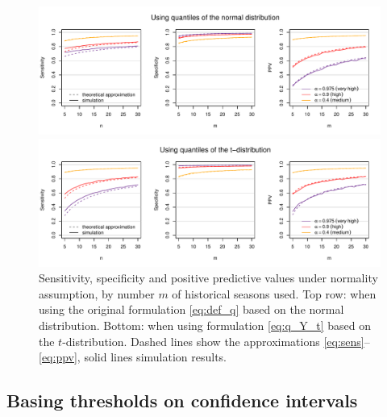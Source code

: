 \documentclass[12pt]{article}
\begin{document}
\begin{figure}[h!]
\begin{center}
\includegraphics[scale=0.75]{figure/analytical_sens_spec.pdf} \vspace{-5mm}

\includegraphics[scale=0.75]{figure/analytical_sens_spec_t.pdf}
\end{center}

\vspace{-10mm}

\caption{Sensitivity, specificity and positive predictive values under normality assumption, by number $m$ of historical seasons used. Top row: when using the original formulation \eqref{eq:def_q} based on the normal distribution. Bottom: when using formulation \eqref{eq:q_Y_t} based on the $t$-distribution. Dashed lines show the approximations \eqref{eq:sens}--\eqref{eq:ppv}, solid lines simulation results.}
\label{fig:sens_spec_ana}
\end{figure}



\subsection{Basing thresholds on confidence intervals}
\label{subsec:cis}
\end{document}
